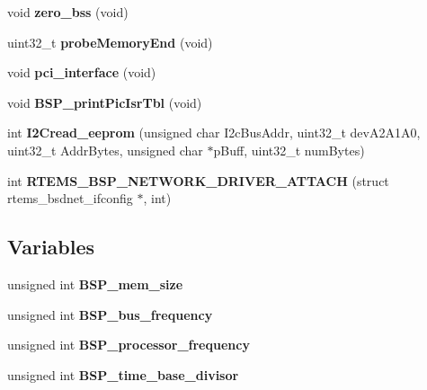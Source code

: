 \begin{DoxyCompactItemize}
\item 
\mbox{\label{group__RTEMSBSPsPowerPCMVME5500_gaa1c249f197a325121cc9678b1665c29b}} 
void {\bfseries zero\+\_\+bss} (void)
\item 
\mbox{\label{group__RTEMSBSPsPowerPCMVME5500_ga6cf955ad0520c8a9213c829a2e80eac3}} 
uint32\+\_\+t {\bfseries probe\+Memory\+End} (void)
\item 
\mbox{\label{group__RTEMSBSPsPowerPCMVME5500_ga3d3f3a886c24f988846da62fbe26226f}} 
void {\bfseries pci\+\_\+interface} (void)
\item 
\mbox{\label{group__RTEMSBSPsPowerPCMVME5500_gade3b4bb294106e45724d3f5539b40a64}} 
void {\bfseries B\+S\+P\+\_\+print\+Pic\+Isr\+Tbl} (void)
\item 
\mbox{\label{group__RTEMSBSPsPowerPCMVME5500_gafda70cbaf4b828cbd500a7d8dd62218e}} 
int {\bfseries I2\+Cread\+\_\+eeprom} (unsigned char I2c\+Bus\+Addr, uint32\+\_\+t dev\+A2\+A1\+A0, uint32\+\_\+t Addr\+Bytes, unsigned char $\ast$p\+Buff, uint32\+\_\+t num\+Bytes)
\item 
\mbox{\label{group__RTEMSBSPsPowerPCMVME5500_ga196055e074e90a7e515b9c2c0f84c617}} 
int {\bfseries R\+T\+E\+M\+S\+\_\+\+B\+S\+P\+\_\+\+N\+E\+T\+W\+O\+R\+K\+\_\+\+D\+R\+I\+V\+E\+R\+\_\+\+A\+T\+T\+A\+CH} (struct rtems\+\_\+bsdnet\+\_\+ifconfig $\ast$, int)
\end{DoxyCompactItemize}
\subsection*{Variables}
\begin{DoxyCompactItemize}
\item 
\mbox{\label{group__RTEMSBSPsPowerPCMVME5500_ga8c4c5c7af3d465fe0600af1ce23505ba}} 
unsigned int {\bfseries B\+S\+P\+\_\+mem\+\_\+size}
\item 
\mbox{\label{group__RTEMSBSPsPowerPCMVME5500_gacebd8212ca7912c89b531e7abaeb8389}} 
unsigned int {\bfseries B\+S\+P\+\_\+bus\+\_\+frequency}
\item 
\mbox{\label{group__RTEMSBSPsPowerPCMVME5500_ga7a8f6379809948b0b0027d0a7b37755f}} 
unsigned int {\bfseries B\+S\+P\+\_\+processor\+\_\+frequency}
\item 
\mbox{\label{group__RTEMSBSPsPowerPCMVME5500_ga98a2dadc74a0a129fcdb66f5e97e01c5}} 
unsigned int {\bfseries B\+S\+P\+\_\+time\+\_\+base\+\_\+divisor}
\end{DoxyCompactItemize}


